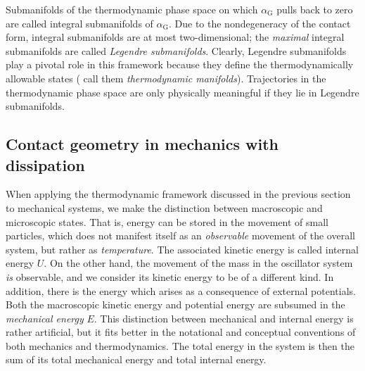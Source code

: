 Submanifolds of the thermodynamic phase space on which $\alpha_\text{G}$ pulls back to zero are called integral submanifolds of $\alpha_\text{G}$. Due to the nondegeneracy of the contact form, integral submanifolds are at most two-dimensional; the \emph{maximal} integral submanifolds are called \emph{Legendre submanifolds}. Clearly, Legendre submanifolds play a pivotal role in this framework because they define the thermodynamically allowable states (\citet{Balian2001} call them \emph{thermodynamic manifolds}). Trajectories in the thermodynamic phase space are only physically meaningful if they lie in Legendre submanifolds.

\subsection{Contact geometry in mechanics with dissipation}
\label{ssec:thermo_dho}

When applying the thermodynamic framework discussed in the previous section to mechanical systems, we make the distinction between macroscopic and microscopic states. That is, energy can be stored in the movement of small particles, which does not manifest itself as an \emph{observable} movement of the overall system, but rather as \emph{temperature}. The associated kinetic energy is called internal energy $U$. On the other hand, the movement of the mass in the oscillator system \emph{is} observable, and we consider its kinetic energy to be of a different kind. In addition, there is the energy which arises as a consequence of external potentials. Both the macroscopic kinetic energy and potential energy are subsumed in the \emph{mechanical energy} $E$. This distinction between mechanical and internal energy is rather artificial, but it fits better in the notational and conceptual conventions of both mechanics and thermodynamics. The total energy in the system is then the sum of its total mechanical energy and total internal energy.

